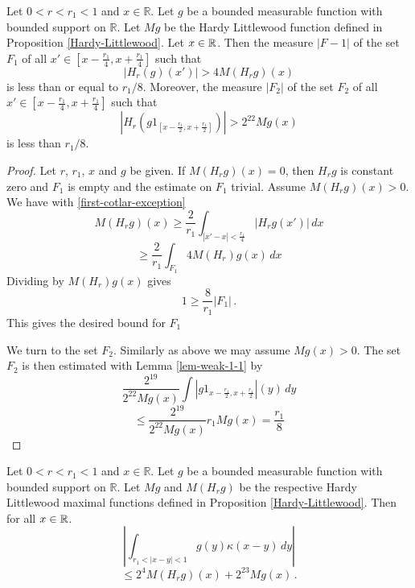 {\begin{lemma}
\label{Cotlar-sets}
Let $0<r<r_1<1$ and  $x\in \mathbb{R}$. Let $g$ be a bounded measurable function with bounded support on $\mathbb{R}$. Let $Mg$ be the Hardy Littlewood function
defined in Proposition
\ref{Hardy-Littlewood}.
Let $x\in {\mathbb{R}}$.
Then the measure $|F-1|$ of the set $F_1$ of all $x'\in
[x-\frac{r_1}4,x+\frac{r_1}4]$ such that
\begin{equation}
\label{first-cotlar-exception}
    |H_{r}(g)(x')|>4M(H_{r}g)(x)
\end{equation}
is less than or equal to $r_1/8$.
Moreover,  the measure $|F_2|$ of the set $F_2$ of all $x'\in
[x-\frac{r_1}4,x+\frac{r_1}4]$ such that
\begin{equation}
\label{second-cotlar-exception}
    |H_{r}(g1_{[x-\frac {r_1} 2,x+\frac {r_1}2]})|>2^{22}Mg(x)
\end{equation}
is less than $r_1/8$.
\end{lemma}

\begin{proof}
Let $r$, $r_1$, $x$ and $g$ be given.
If $M(H_{r}g)(x)=0$, then $H_{r}g$ is constant zero
and $F_1$ is empty and the estimate on $F_1$ trivial.
Assume $M(H_{r}g)(x)>0$.
We have with \eqref{first-cotlar-exception}
\begin{equation}
    M(H_{r}g)(x)\ge
    \frac 2{r_1}\int_{|x'-x|<\frac {r_1}4}|H_{r}g(x')|\, dx
\end{equation}
\begin{equation}
    \ge
    \frac 2{r_1}\int_{F_1} 4 M(H_{r})g(x)\, dx
\end{equation}
Dividing by $M(H_{r})g(x)$ gives
\begin{equation}
    1\ge  \frac 8{r_1} |F_1|\, .
\end{equation}
This gives the desired bound for $F_1$

We turn to the set $F_2$. Similarly as above we may assume $Mg(x)>0$.
The set $F_2$ is then estimated with Lemma \ref{lem-weak-1-1}
by
\begin{equation}
   \frac {2^{19}}{2^{22}Mg(x)}\int |g1_{x-\frac {r_1}2, x+\frac {r_1}2}|(y)\, dy
\end{equation}
\begin{equation}
   \le \frac {2^{19}}{2^{22}Mg(x)}r_1Mg(x)= \frac {r_1}8
\end{equation}


\end{proof}

\begin{lemma}
\label{Cotlar-estimate}
Let $0<r<r_1<1$ and  $x\in \mathbb{R}$. Let $g$ be a bounded measurable function with bounded support on $\mathbb{R}$. Let $Mg$ and $M(H_r g)$ be the respective Hardy Littlewood maximal functions
defined in Proposition
\ref{Hardy-Littlewood}.
Then for all $x\in {\mathbb{R}}$.
\begin{equation}\label{eq-cotlar-estimate}
\left|
\int_{r_1<|x-y|<1}
g(y) \kappa(x-y)\, dy
\right|
\end{equation}
\begin{equation}\le
2^{4}M(H_rg)(x)+ 2^{23} Mg(x)
\, .
\end{equation}
\end{lemma}


}
